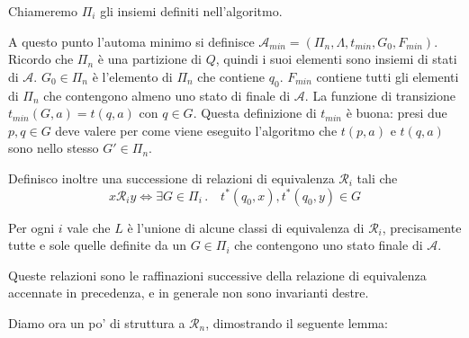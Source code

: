 \documentclass[12pt]{article}
\numberwithin{theorem}{subsection}
\begin{document}
Chiameremo $\Pi_i$ gli insiemi  definiti nell'algoritmo.

A questo punto l'automa minimo si definisce $\mathcal{A}_{min} = (\Pi_n, \Lambda, t_{min}, G_0, F_{min})$. Ricordo che $\Pi_n$ è una partizione di $Q$, quindi i suoi elementi sono insiemi di stati di $\mathcal{A}$. $G_0 \in \Pi_n$ è l'elemento di $\Pi_n$ che contiene $q_0$. $F_{min}$ contiene tutti gli elementi di $\Pi_n$ che contengono almeno uno stato di finale di $\mathcal{A}$. La funzione di transizione $t_{min}(G, a) = t(q, a)$ con $q \in G$. Questa definizione di $t_{min}$ è buona: presi due $p, q \in G$ deve valere per come viene eseguito l'algoritmo che $t(p, a)$ e $t(q, a)$ sono nello stesso $G' \in \Pi_n$.

Definisco inoltre una successione di relazioni di equivalenza $\mathcal{R}_i$ tali che
\[
x \mathcal{R}_i y \iff \exists G \in \Pi_i \,.\quad t^*(q_0, x), t^*(q_0, y) \in G
\]

\begin{remark}
	Per ogni $i$ vale che $L$ è l'unione di alcune classi di equivalenza di $\mathcal{R}_i$, precisamente tutte e sole quelle definite da un $G \in \Pi_i$ che contengono uno stato finale di $\mathcal{A}$.
\end{remark}

Queste relazioni sono le raffinazioni successive della relazione di equivalenza accennate in precedenza, e in generale non sono invarianti destre.

Diamo ora un po' di struttura a $\mathcal{R}_n$, dimostrando il seguente lemma:
\end{document}
